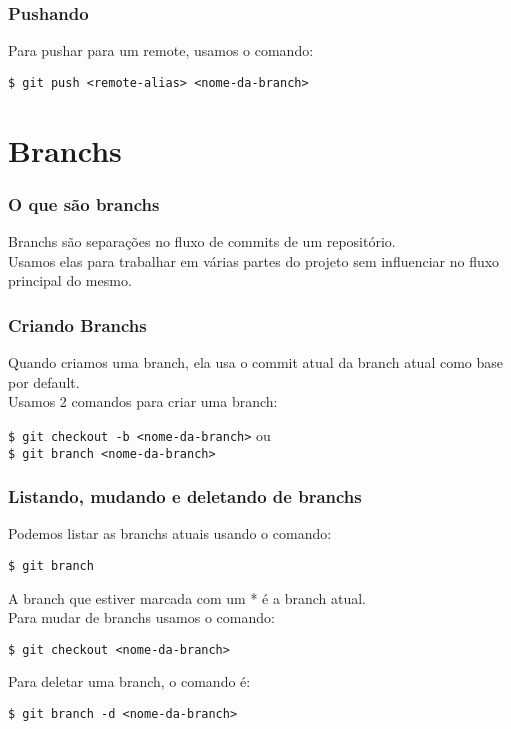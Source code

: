 \documentclass[brazil]{beamer}
\begin{document}
\begin{frame}[fragile]
  \frametitle{Pushando}
  Para pushar para um remote, usamos o comando:
  \begin{block}{}
    \verb#$ git push <remote-alias> <nome-da-branch>#
  \end{block}
\end{frame}

\section{Branchs}

\begin{frame}[fragile]
  \frametitle{O que são branchs}
  Branchs são separações no fluxo de commits de um repositório. \\
  \pause
  Usamos elas para trabalhar em várias partes do projeto sem influenciar no fluxo principal do mesmo. \\
\end{frame}

\begin{frame}[fragile]
  \frametitle{Criando Branchs}
  Quando criamos uma branch, ela usa o commit atual da branch atual como base por default. \\
  Usamos 2 comandos para criar uma branch:
  \begin{block}{}
    \verb#$ git checkout -b <nome-da-branch># ou \\
    \verb#$ git branch <nome-da-branch>#
  \end{block}
\end{frame}

\begin{frame}[fragile]
  \frametitle{Listando, mudando e deletando de branchs}
  Podemos listar as branchs atuais usando o comando:
  \begin{block}{}
    \verb#$ git branch#
  \end{block}
  A branch que estiver marcada com um * é a branch atual. \\
  \pause
  Para mudar de branchs usamos o comando:
  \begin{block}{}
    \verb#$ git checkout <nome-da-branch>#
  \end{block}
  \pause
  Para deletar uma branch, o comando é:
  \begin{block}{}
    \verb#$ git branch -d <nome-da-branch>#
  \end{block}
\end{frame}
\end{document}
